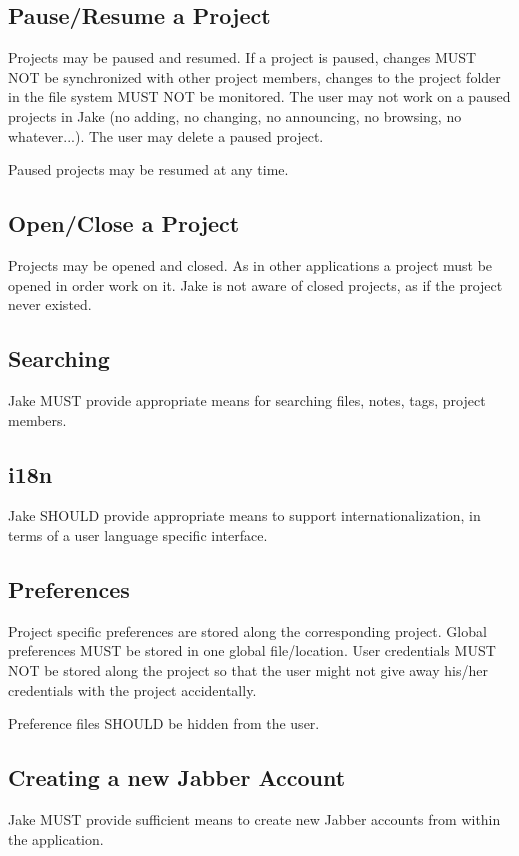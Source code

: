 \subsection{Pause/Resume a Project}
Projects may be paused and resumed. If a project is paused, changes MUST NOT be synchronized with other project members, changes to the project folder in the file system MUST NOT be monitored. The user may not work on a paused projects in Jake (no adding, no changing, no announcing, no browsing, no whatever...). The user may delete a paused project. 

Paused projects may be resumed at any time.

\subsection{Open/Close a Project}
Projects may be opened and closed. As in other applications a project must be opened in order work on it. Jake is not aware of closed projects, as if the project never existed. 

\subsection{Searching}
Jake MUST provide appropriate means for searching files, notes, tags, project members.

\subsection{i18n}
Jake SHOULD provide appropriate means to support internationalization, in terms of a user language specific interface.

\subsection{Preferences}
Project specific preferences are stored along the corresponding project. Global preferences MUST be stored in one global file/location. User credentials MUST NOT be stored along the project so that the user might not give away his/her credentials with the project accidentally.

Preference files SHOULD be hidden from the user.

\subsection{Creating a new Jabber Account}
Jake MUST provide sufficient means to create new Jabber accounts from within the application.

